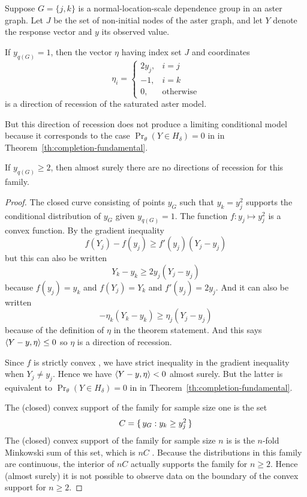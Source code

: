 \begin{theorem} \label{th:dor-normal}
Suppose $G = \{j, k\}$ is a normal-location-scale dependence group
in an aster graph.
Let $J$ be the set of non-initial nodes of the aster graph,
and let $Y$ denote the response vector and $y$ its observed value.

If $y_{q(G)} = 1$, then the vector $\eta$ having index set $J$
and coordinates
\begin{equation} \label{eq:dor-normal}
   \eta_i = \begin{cases} 2 y_j, & i = j \\
   -1, & i = k \\
   0, & \text{otherwise} \end{cases}
\end{equation}
is a direction of recession of the saturated aster model.

But this direction of recession does not produce a limiting conditional model
because it corresponds to the case $\Pr_\theta(Y \in H_\delta) = 0$ in
in Theorem~\ref{th:completion-fundamental}.

If $y_{q(G)} \ge 2$, then almost surely there are no directions of recession
for this family.
\end{theorem}
\begin{proof}
The closed curve consisting of points $y_G$ such that $y_k = y_j^2$
supports the conditional distribution of $y_G$ given $y_{q(G)} = 1$.
The function $f : y_j \mapsto y_j^2$ is a convex function.
By the gradient inequality \citep[Theorem~2.13 (b)]{rockafellar-wets}
$$
   f(Y_j) - f(y_j) \ge f'(y_j) (Y_j - y_j)
$$
but this can also be written
$$
   Y_k - y_k \ge 2 y_j (Y_j - y_j)
$$
because $f(y_j) = y_k$ and $f(Y_j) = Y_k$ and $f'(y_j) = 2 y_j$.
And it can also be written
$$
   - \eta_k (Y_k - y_k) \ge \eta_j (Y_j - y_j)
$$
because of the definition of $\eta$ in the theorem statement.
And this says $\langle Y - y, \eta \rangle \le 0$ so $\eta$ is a direction of
recession.

Since $f$ is strictly convex
\citep[Theorem~2.13 ($\text{a}'$)]{rockafellar-wets},
we have strict inequality in the gradient inequality
\citep[Theorem~2.13 ($\text{b}'$)]{rockafellar-wets} when $Y_j \neq y_j$.
Hence we have \hbox{$\langle Y - y, \eta \rangle < 0$} almost surely.
But the latter is equivalent to $\Pr_\theta(Y \in H_\delta) = 0$ in
in Theorem~\ref{th:completion-fundamental}.

The (closed) convex support of the family for sample size one is
the set
$$
   C = \{\,  y_G : y_k \ge y_j^2  \,\}
$$
The (closed) convex support of the family for sample size $n$ is
is the $n$-fold Minkowski sum of this set, which is $n C$
\citep[Proposition~2.23]{rockafellar-wets}.  Because the distributions
in this family are continuous, the interior of $n C$ actually supports
the family for $n \ge 2$.  Hence (almost surely) it is not possible
to observe data on the boundary of the convex support for $n \ge 2$.
\end{proof}

